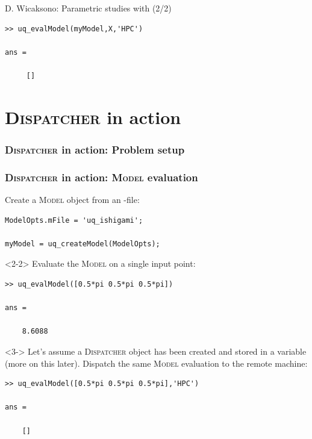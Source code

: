 \documentclass[]{rsuqbeamernew}
\begin{document}
\begin{frame}[fragile]{D. Wicaksono: Parametric studies with  (2/2)}

\begin{lstlisting}[basicstyle=\scriptsize,numbers=none]
>> uq_evalModel(myModel,X,'HPC')

ans =

     []
\end{lstlisting}


\end{frame}


\section{\textsc{Dispatcher} in action}

\begin{frame}[fragile]
\frametitle<1>{\textsc{Dispatcher} in action: Problem setup}
\frametitle<2->{\textsc{Dispatcher} in action: \textsc{Model} evaluation}

Create a \textsc{Model} object from an -file:
\begin{lstlisting}[basicstyle=\scriptsize]
ModelOpts.mFile = 'uq_ishigami';

myModel = uq_createModel(ModelOpts);
\end{lstlisting}

\begin{onlyenv}<2-2>
Evaluate the \textsc{Model} on a single input point:
\begin{lstlisting}[basicstyle=\scriptsize,numbers=none]
>> uq_evalModel([0.5*pi 0.5*pi 0.5*pi])

ans =
  
    8.6088
\end{lstlisting}
\end{onlyenv}

\begin{onlyenv}<3->
Let's assume a \textsc{Dispatcher} object has been created
and stored in a variable  ({\altx more on this later}).
Dispatch the same \textsc{Model} evaluation to the remote machine:
\begin{lstlisting}[basicstyle=\scriptsize,numbers=none]
>> uq_evalModel([0.5*pi 0.5*pi 0.5*pi],'HPC')
  
ans =
    
    []
\end{lstlisting}
\end{onlyenv}

  
\end{frame}
\end{document}
